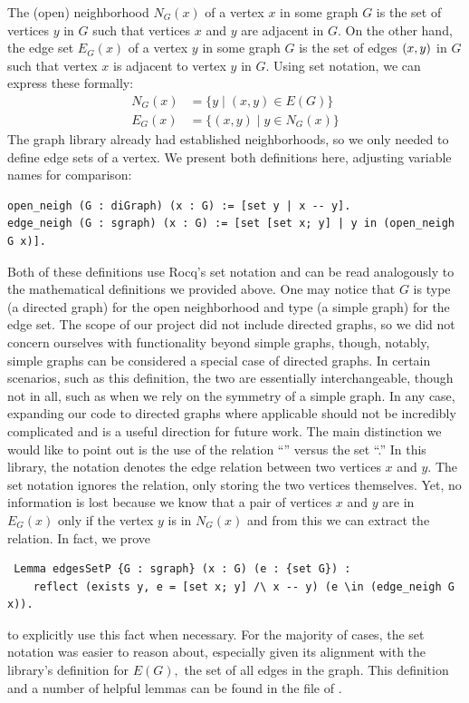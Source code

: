 The (open) neighborhood $N_G(x)$ of a vertex $x$ in some graph $G$ is the set of vertices $y$ in $G$ such that vertices $x$ and $y$ are adjacent in $G.$ On the other hand, the edge set $E_G(x)$ of a vertex $y$ in some graph $G$ is the set of edges $(x, y)$ in $G$ such that vertex $x$ is adjacent to vertex $y$ in $G.$ Using set notation, we can express these formally:
\begin{align*}
    N_G(x) &= \{y \mid (x, y) \in E(G) \}\\
    E_G(x) &= \{(x, y) \mid y \in N_G(x)\}
\end{align*}
The graph library already had established neighborhoods, so we only needed to define edge sets of a vertex. We present both definitions here, adjusting variable names for comparison:
\begin{verbatim}
open_neigh (G : diGraph) (x : G) := [set y | x -- y].
edge_neigh (G : sgraph) (x : G) := [set [set x; y] | y in (open_neigh G x)].
\end{verbatim}
Both of these definitions use Rocq's set notation and can be read analogously to the mathematical definitions we provided above. One may notice that $G$ is type  (a directed graph) for the open neighborhood and type  (a simple graph) for the edge set. The scope of our project did not include directed graphs, so we did not concern ourselves with functionality beyond simple graphs, though, notably, simple graphs can be considered a special case of directed graphs. In certain scenarios, such as this definition, the two are essentially interchangeable, though not in all, such as when we rely on the symmetry of a simple graph. In any case, expanding our code to directed graphs where applicable should not be incredibly complicated and is a useful direction for future work. The main distinction we would like to point out is the use of the relation ``'' versus the set ``\fxn{[set x; y]}.'' In this library, the notation  denotes the edge relation between two vertices $x$ and $y.$ The set notation \fxn{[set x; y]} ignores the relation, only storing the two vertices themselves. Yet, no information is lost because we know that a pair of vertices $x$ and $y$ are in $E_G(x)$ only if the vertex $y$ is in $N_G(x)$ and from this we can extract the relation. In fact, we prove 
\begin{verbatim}
 Lemma edgesSetP {G : sgraph} (x : G) (e : {set G}) :
    reflect (exists y, e = [set x; y] /\ x -- y) (e \in (edge_neigh G x)).
\end{verbatim}
to explicitly use this fact when necessary. For the majority of cases, the set notation was easier to reason about, especially given its alignment with the library's definition for $E(G),$ the set of all edges in the graph. This definition and a number of helpful lemmas can be found in the  file of \cite{my_code}.

